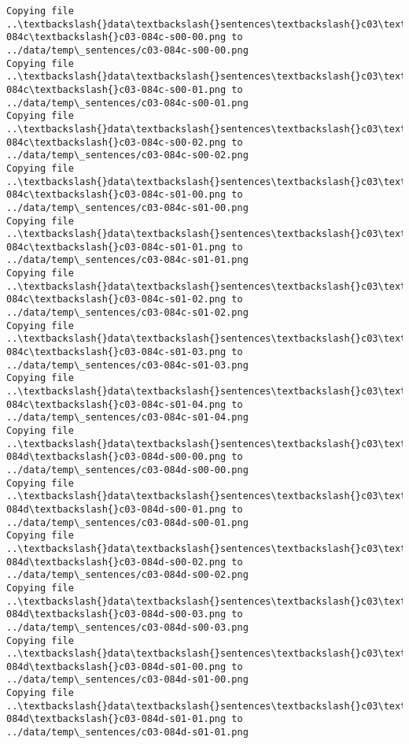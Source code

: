 \documentclass[11pt]{article}
\begin{document}
\begin{Verbatim}[commandchars=\\\{\}]
Copying file ..\textbackslash{}data\textbackslash{}sentences\textbackslash{}c03\textbackslash{}c03-084c\textbackslash{}c03-084c-s00-00.png to
../data/temp\_sentences/c03-084c-s00-00.png
Copying file ..\textbackslash{}data\textbackslash{}sentences\textbackslash{}c03\textbackslash{}c03-084c\textbackslash{}c03-084c-s00-01.png to
../data/temp\_sentences/c03-084c-s00-01.png
Copying file ..\textbackslash{}data\textbackslash{}sentences\textbackslash{}c03\textbackslash{}c03-084c\textbackslash{}c03-084c-s00-02.png to
../data/temp\_sentences/c03-084c-s00-02.png
Copying file ..\textbackslash{}data\textbackslash{}sentences\textbackslash{}c03\textbackslash{}c03-084c\textbackslash{}c03-084c-s01-00.png to
../data/temp\_sentences/c03-084c-s01-00.png
Copying file ..\textbackslash{}data\textbackslash{}sentences\textbackslash{}c03\textbackslash{}c03-084c\textbackslash{}c03-084c-s01-01.png to
../data/temp\_sentences/c03-084c-s01-01.png
Copying file ..\textbackslash{}data\textbackslash{}sentences\textbackslash{}c03\textbackslash{}c03-084c\textbackslash{}c03-084c-s01-02.png to
../data/temp\_sentences/c03-084c-s01-02.png
Copying file ..\textbackslash{}data\textbackslash{}sentences\textbackslash{}c03\textbackslash{}c03-084c\textbackslash{}c03-084c-s01-03.png to
../data/temp\_sentences/c03-084c-s01-03.png
Copying file ..\textbackslash{}data\textbackslash{}sentences\textbackslash{}c03\textbackslash{}c03-084c\textbackslash{}c03-084c-s01-04.png to
../data/temp\_sentences/c03-084c-s01-04.png
Copying file ..\textbackslash{}data\textbackslash{}sentences\textbackslash{}c03\textbackslash{}c03-084d\textbackslash{}c03-084d-s00-00.png to
../data/temp\_sentences/c03-084d-s00-00.png
Copying file ..\textbackslash{}data\textbackslash{}sentences\textbackslash{}c03\textbackslash{}c03-084d\textbackslash{}c03-084d-s00-01.png to
../data/temp\_sentences/c03-084d-s00-01.png
Copying file ..\textbackslash{}data\textbackslash{}sentences\textbackslash{}c03\textbackslash{}c03-084d\textbackslash{}c03-084d-s00-02.png to
../data/temp\_sentences/c03-084d-s00-02.png
Copying file ..\textbackslash{}data\textbackslash{}sentences\textbackslash{}c03\textbackslash{}c03-084d\textbackslash{}c03-084d-s00-03.png to
../data/temp\_sentences/c03-084d-s00-03.png
Copying file ..\textbackslash{}data\textbackslash{}sentences\textbackslash{}c03\textbackslash{}c03-084d\textbackslash{}c03-084d-s01-00.png to
../data/temp\_sentences/c03-084d-s01-00.png
Copying file ..\textbackslash{}data\textbackslash{}sentences\textbackslash{}c03\textbackslash{}c03-084d\textbackslash{}c03-084d-s01-01.png to
../data/temp\_sentences/c03-084d-s01-01.png

\end{Verbatim}
\end{document}
